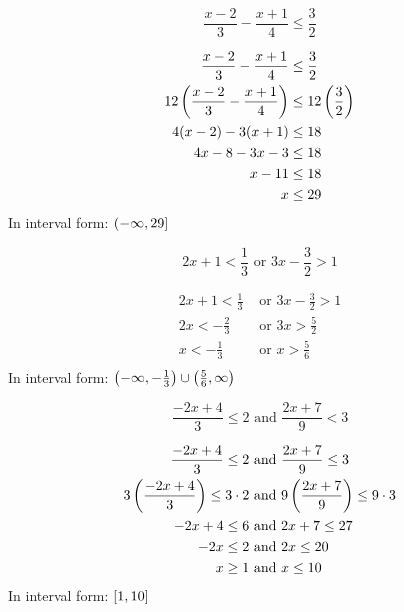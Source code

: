 \documentclass[letterpaper, landscape]{exam}
\begin{document}
\begin{questions}
    \question[7]
      \[ 
        \frac{x - 2}{3} - \frac{x + 1}{4} \leq \frac{3}{2} 
      \]

      \begin{solution}
        \begin{align*}
          \frac{x - 2}{3} - \frac{x + 1}{4}            & \leq \frac{3}{2} \\
          12 \del{ \frac{x - 2}{3} - \frac{x + 1}{4} } & \leq 12 \del{ \frac{3}{2} } \\
          4(x - 2) - 3(x + 1)                          & \leq 18 \\
          4x - 8 - 3x - 3                              & \leq 18 \\
          x - 11                                       & \leq 18 \\
          x                                            & \leq 29 \\
        \end{align*}
        In interval form: $\intoc{ -\infty, 29 }$
      \end{solution}

    \question[10]
      \[ 
        2x + 1 < \frac{1}{3} \text { or } 3x - \frac{3}{2} > 1 
      \]

      \begin{solution}
        \begin{align*}
          2x + 1 < \frac{1}{3} & \text{ or } 3x - \frac{3}{2} > 1 \\
          2x < -\frac{2}{3}    & \text{ or } 3x > \frac{5}{2} \\
          x < -\frac{1}{3}     & \text{ or } x > \frac{5}{6} \\
        \end{align*}
        In interval form: $ \intoo{ -\infty, -\frac{1}{3} } \cup \intoo{ \frac{5}{6}, \infty }$
      \end{solution}

    \question[10]
      \[ 
        \frac{-2x + 4}{3} \leq 2 \text{ and } \frac{2x + 7}{9} < 3 
      \]

      \begin{solution}
        \begin{align*}
          \frac{-2x + 4}{3} \leq 2                   & \text{ and } \frac{2x + 7}{9} \leq 3 \\
          3 \del{ \frac{-2x + 4}{3} } \leq 3 \cdot 2 & \text{ and } 9 \del{ \frac{2x + 7}{9} } \leq 9 \cdot 3 \\
          -2x + 4 \leq 6                             & \text{ and } 2x + 7 \leq 27 \\
          -2x \leq 2                                 & \text{ and } 2x \leq 20 \\
          x \geq 1                                   & \text{ and } x \leq 10 \\
        \end{align*}
        In interval form: $\intcc{ 1, 10 }$
      \end{solution}


\end{questions}
\end{document}
